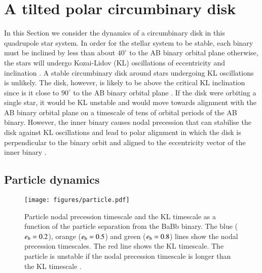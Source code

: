 \documentclass{aa}
\begin{document}
\section{A tilted polar circumbinary disk}\label{sec:theory}

In this Section we consider the dynamics of a circumbinary disk in this quadrupole star system. 
%
In order for the stellar system to be stable, each binary must be inclined by less than about $40^\circ$ to the AB binary orbital plane otherwise, the stars will undergo Kozai-Lidov (KL) oscillations of eccentricity and inclination \citep{vonZeipel1910,Kozai1962,Lidov1962}.
%
A stable circumbinary disk around stars undergoing KL oscillations is unlikely. 
%
The disk, however, is likely to  be above the critical KL inclination since is it close to $90^\circ$ to the AB binary orbital plane \citep{Lubow2017,Zanazzi2017}.
%
If the disk were orbiting a single star, it would be KL unstable \citep{Martin2014,Fu2015} and would move towards alignment with the AB binary orbital plane on a timescale of tens of orbital periods of the AB binary.
%
However, the inner binary causes nodal precession that can stabilise the disk against KL oscillations \citep{Verrier2009,Martin2022} and lead to polar alignment in which the disk is perpendicular to the binary orbit and aligned to the eccentricity vector of the inner binary \citep{Martin17}.
%


\subsection{Particle dynamics}

\begin{figure}
\begin{center}
    \centering
    \texttt{[image: figures/particle.pdf]}
    \caption{Particle nodal precession timescale and the KL timescale as a function of the particle separation from  the BaBb binary. 
    The blue ($e_{\rm b}=0.2$),  orange ($e_{\rm b}=0.5$) and green ($e_{\rm b}=0.8$) lines show the nodal precession timescales.
    The red line shows the KL timescale.
    The particle is unstable if  the nodal precession timescale is longer than the KL timescale \citep{Verrier2009}. }
\label{fig:particles}
\end{center}
\end{figure}
\end{document}
